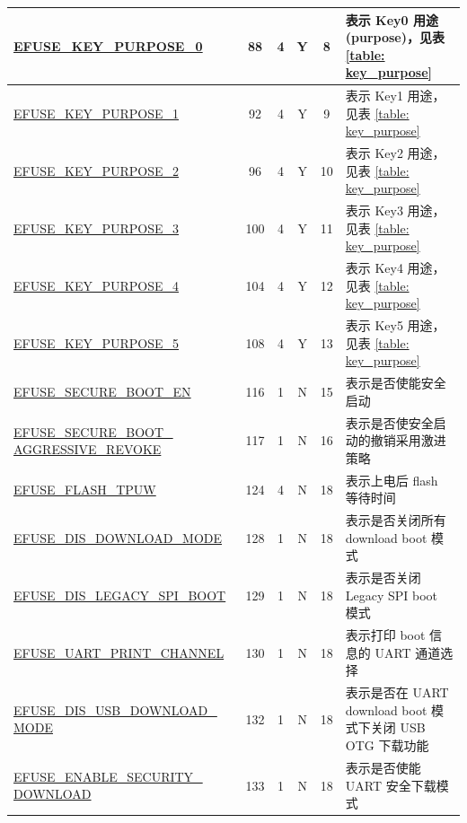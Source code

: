 \begin{longtable}[l]{ |m{5.2cm}|c|c|c|c|m{5.5cm}| }
    \hline
    \hyperref[fielddesc:EFUSEKEYPURPOSE0]{EFUSE\_KEY\_PURPOSE\_0} & 88 & 4 & Y & 8 & 表示 Key0 用途 (purpose)，见表 \ref{table: key_purpose} \\
    \hline
    \hyperref[fielddesc:EFUSEKEYPURPOSE1]{EFUSE\_KEY\_PURPOSE\_1} & 92 & 4 & Y & 9 & 表示 Key1 用途，见表 \ref{table: key_purpose} \\
    \hline
    \hyperref[fielddesc:EFUSEKEYPURPOSE2]{EFUSE\_KEY\_PURPOSE\_2} & 96 & 4 & Y & 10 & 表示 Key2 用途，见表 \ref{table: key_purpose} \\ 
    \hline
    \hyperref[fielddesc:EFUSEKEYPURPOSE3]{EFUSE\_KEY\_PURPOSE\_3} & 100 & 4 & Y & 11 &  表示 Key3 用途，见表 \ref{table: key_purpose} \\    
    \hline
    \hyperref[fielddesc:EFUSEKEYPURPOSE4]{EFUSE\_KEY\_PURPOSE\_4} & 104 & 4 & Y & 12 & 表示 Key4 用途，见表 \ref{table: key_purpose} \\    
    \hline
    \hyperref[fielddesc:EFUSEKEYPURPOSE5]{EFUSE\_KEY\_PURPOSE\_5} & 108 & 4 & Y & 13 & 表示 Key5 用途，见表 \ref{table: key_purpose} \\  
    \hline
    \hyperref[fielddesc:EFUSESECUREBOOTEN]{EFUSE\_SECURE\_BOOT\_EN} & 116 & 1 & N & 15 & 表示是否使能安全启动 \\ 
    \hline
    \hyperref[fielddesc:EFUSESECUREBOOTAGGRESSIVEREVOKE]{EFUSE\_SECURE\_BOOT\_ AGGRESSIVE\_REVOKE} & 117 & 1 & N & 16 & 表示是否使安全启动的撤销采用激进策略 \\
    \hline
    \hyperref[fielddesc:EFUSEFLASHTPUW]{EFUSE\_FLASH\_TPUW} & 124 & 4 & N & 18 & 表示上电后 flash 等待时间 \\    
    \hline    
    \hyperref[fielddesc:EFUSEDISDOWNLOADMODE]{EFUSE\_DIS\_DOWNLOAD\_MODE} & 128 & 1 & N & 18 & 表示是否关闭所有 download boot 模式\\       
    \hline
    \hyperref[fielddesc:EFUSEDISLEGACYSPIBOOT]{EFUSE\_DIS\_LEGACY\_SPI\_BOOT} & 129 & 1 & N & 18 & 表示是否关闭 Legacy SPI boot 模式 \\
    \hline
    \hyperref[fielddesc:EFUSEUARTPRINTCHANNEL]{EFUSE\_UART\_PRINT\_CHANNEL} & 130 & 1 & N & 18 & 表示打印 boot 信息的 UART 通道选择 \\
    \hline 
    \hyperref[fielddesc:EFUSEDISUSBDOWNLOADMODE]{EFUSE\_DIS\_USB\_DOWNLOAD\_ MODE} & 132 & 1 & N & 18 & 表示是否在 UART download boot 模式下关闭 USB OTG 下载功能 \\
    \hline 
    \hyperref[fielddesc:EFUSEENABLESECURITYDOWNLOAD]{EFUSE\_ENABLE\_SECURITY\_ DOWNLOAD} & 133 & 1 & N & 18 & 表示是否使能 UART 安全下载模式 \\

\end{longtable}
